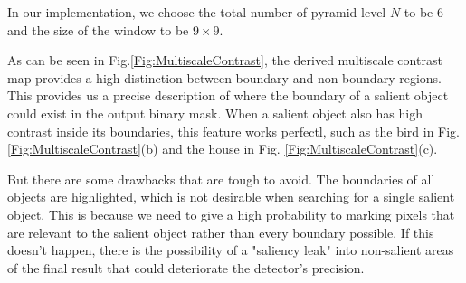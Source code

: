 \documentclass[10pt,twocolumn,letterpaper]{article}
\begin{document}
In our implementation, we choose the total number of pyramid level $N$ to be $6$ and the size of the window to be $9 \times 9$. 

As can be seen in Fig.\ref{Fig:MultiscaleContrast}, the derived multiscale contrast map provides 
a high distinction between boundary and non-boundary regions. This provides us a precise description
of where the boundary of a salient object could exist in the output binary mask. When a salient
object also has high contrast inside its boundaries, this feature works perfectl, such as the bird
in Fig.\ref{Fig:MultiscaleContrast}{(b)} and the house in Fig. \ref{Fig:MultiscaleContrast}{(c)}.

But there are some drawbacks that are tough to avoid. The boundaries of all objects are highlighted, which is not desirable when searching for a single salient object.  This is because we need to give a high probability to marking pixels that are relevant to the salient object rather than every boundary possible. If this doesn't happen, there is the possibility of a "saliency leak" into non-salient areas of the final result that could deteriorate the detector's precision.
\end{document}
